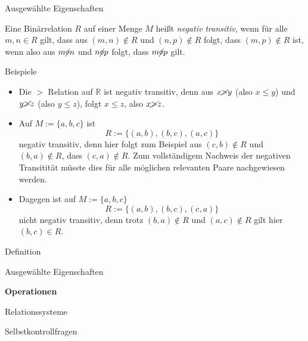 \documentclass[
  8pt,
  ignorenonframetext,
]{beamer}
\providecommand{\tightlist}{%
  \setlength{\itemsep}{0pt}\setlength{\parskip}{0pt}}
\begin{document}
\begin{frame}{Ausgewählte Eigenschaften}
\protect\hypertarget{ausgewuxe4hlte-eigenschaften-4}{}
\small
\begin{definition}
\justifying
Eine Binärrelation $R$ auf einer Menge $M$ heißt \textit{negativ transitiv}, wenn für alle
$m,n\in R$ gilt, dass aus $(m,n)\notin R$ und $(n,p)\notin R$ folgt, dass $(m,p) \notin R$ ist,
wenn also aus $m \cancel{\diamond} n$ und $n \cancel{\diamond} p$ folgt, dass $m \cancel{\diamond} p$ gilt.
\end{definition}

\footnotesize

Beispiele

\begin{itemize}
\tightlist
\item
  Die \(>\) Relation auf \(\mathbb{R}\) ist negativ transitiv, denn aus
  \(x \cancel{>} y\) (also \(x \le y\)) und \(y \cancel{>} z\) (also
  \(y \le z\)), folgt \(x \le z\), also \(x \cancel{>} z\).
\item
  Auf \(M := \{a,b,c\}\) ist \begin{equation}
  R := \{(a,b), (b,c), (a,c)\}
  \end{equation} negativ transitiv, denn hier folgt zum Beispiel aus
  \((c,b) \notin R\) und \((b,a) \notin R\), dass \((c,a) \notin R\).
  Zum vollständigem Nachweis der negativen Transitität müsste dies für
  alle möglichen relevanten Paare nachgewiesen werden.
\item
  Dagegen ist auf \(M := \{a,b,c\}\)\\
  \begin{equation}
  R := \{(a,b), (b,c), (c,a)\}
  \end{equation} nicht negativ transitiv, denn trotz \((b,a) \notin R\)
  und \((a,c) \notin R\) gilt hier \((b,c) \in R\).
\end{itemize}
\end{frame}

\begin{frame}{}
\protect\hypertarget{section-5}{}
\vfill
\Large

Definition

Ausgewählte Eigenschaften

\textbf{Operationen}

Relationssysteme

Selbstkontrollfragen \vfill
\end{frame}
\end{document}

